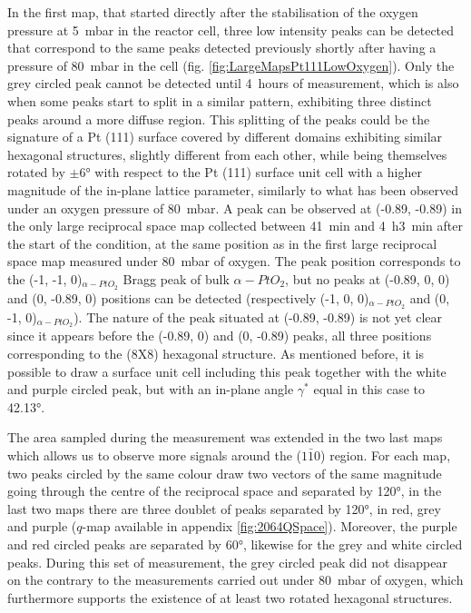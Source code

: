 In the first map, that started directly after the stabilisation of the oxygen pressure at \qty{5}{\milli\bar} in the reactor cell, three low intensity peaks can be detected that correspond to the same peaks detected previously shortly after having a pressure of \qty{80}{\milli\bar} in the cell (fig. \ref{fig:LargeMapsPt111LowOxygen}).
Only the grey circled peak cannot be detected until \qty{4}{hours} of measurement, which is also when some peaks start to split in a similar pattern, exhibiting three distinct peaks around a more diffuse region.
This splitting of the peaks could be the signature of a Pt (111) surface covered by different domains exhibiting similar hexagonal structures, slightly different from each other, while being themselves rotated by $\pm \ang{6}$ with respect to the Pt (111) surface unit cell with a higher magnitude of the in-plane lattice parameter, similarly to what has been observed under an oxygen pressure of \qty{80}{\milli\bar}.
A peak can be observed at (-0.89, -0.89) in the only large reciprocal space map collected between \qty{41}{\minute} and \qty{4}{\hour}\qty{3}{\minute} after the start of the condition, at the same position as in the first large reciprocal space map measured under \qty{80}{\milli\bar} of oxygen.
The peak position corresponds to the (-1, -1, 0)$_{\alpha-PtO_2}$ Bragg peak of bulk $\alpha-PtO_2$, but no peaks at (-0.89, 0, 0) and (0, -0.89, 0) positions can be detected (respectively (-1, 0, 0)$_{\alpha-PtO_2}$ and (0, -1, 0)$_{\alpha-PtO_2}$).
The nature of the peak situated at (-0.89, -0.89) is not yet clear since it appears before the (-0.89, 0) and (0, -0.89) peaks, all three positions corresponding to the (8X8) hexagonal structure.
As mentioned before, it is possible to draw a surface unit cell including this peak together with the white and purple circled peak, but with an in-plane angle $\gamma^*$ equal in this case to \ang{42.13}.

The area sampled during the measurement was extended in the two last maps which allows us to observe more signals around the ($1\bar{1}0$) region.
For each map, two peaks circled by the same colour draw two vectors of the same magnitude going through the centre of the reciprocal space and separated by \ang{120}, in the last two maps there are three doublet of peaks separated by \ang{120}, in red, grey and purple ($q$-map available in appendix \ref{fig:2064QSpace}).
Moreover, the purple and red circled peaks are separated by \ang{60}, likewise for the grey and white circled peaks.
During this set of measurement, the grey circled peak did not disappear on the contrary to the measurements carried out under \qty{80}{\milli\bar} of oxygen, which furthermore supports the existence of at least two rotated hexagonal structures.

